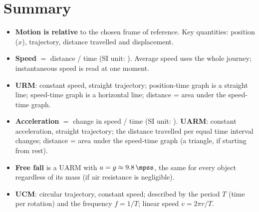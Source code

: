 

\section*{Summary}

\begin{itemize}
    \item \textbf{Motion is relative} to the chosen frame of reference. Key quantities: position (\(x\)), trajectory, distance travelled and displacement.
    \item \textbf{Speed} \(= \) distance / time (SI unit: \unit{\mps}). Average speed uses the whole journey; instantaneous speed is read at one moment.
    \item \textbf{URM}: constant speed, straight trajectory; position-time graph is a straight line; speed-time graph is a horizontal line; distance = area under the speed-time graph.
    \item \textbf{Acceleration} \(=\) change in speed / time (SI unit: \unit{\mpss}). \textbf{UARM}: constant acceleration, straight trajectory; the distance travelled per equal time interval changes; distance = area under the speed-time graph (a triangle, if starting from rest).
    \item \textbf{Free fall} is a UARM with \(a = g \approx \qty{9.8}{\mpss}\), the same for every object regardless of its mass (if air resistance is negligible).
    \item \textbf{UCM}: circular trajectory, constant speed; described by the period \(T\) (time per rotation) and the frequency \(f = 1/T\); linear speed \(v = 2\pi r / T\).
\end{itemize}

